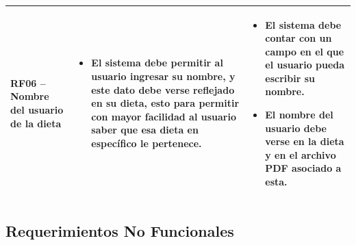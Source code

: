 \begin{longtable}[c]{| p{}  | p{}  | p{}  |}
         \textbf{RF06 -- Nombre del usuario de la dieta} & \begin{itemize}
             \item El sistema debe permitir al usuario ingresar su nombre, y este dato debe verse reflejado en su dieta, esto para permitir con mayor facilidad al usuario saber que esa dieta en espec\'ifico le pertenece.
         \end{itemize}& \begin{itemize}
             \item El sistema debe contar con un campo en el que el usuario pueda escribir su nombre.
             \item El nombre del usuario debe verse en la dieta y en el archivo PDF asociado a esta.
         \end{itemize} \\  \hline

\end{longtable}


\subsection{Requerimientos No Funcionales}


